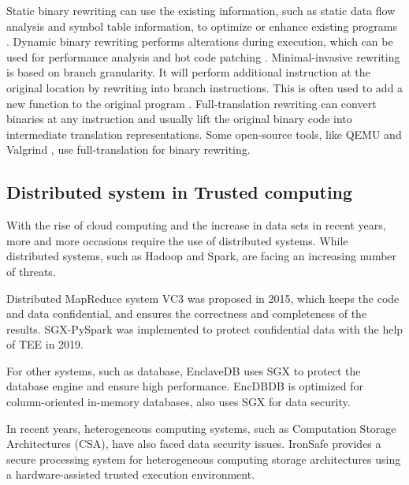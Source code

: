 Static binary rewriting can use the existing information, such as static data flow analysis and
symbol table information, to optimize or enhance existing programs \cite{10.1145/2629335, Schwarz2007PLTOAL}.
Dynamic binary rewriting performs alterations during execution, which can be used for
performance analysis \cite{Luk2005PinBC} and hot code patching \cite{Bruening2003AnIF}.
Minimal-invasive rewriting is based on branch granularity. It will perform additional instruction
at the original location by rewriting into branch instructions. This is often used to add a new
function to the original program \cite{Federico2017revngAU}.
Full-translation rewriting can convert binaries at any instruction and usually lift the original
binary code into intermediate translation representations. Some open-source tools,
like QEMU \cite{Bellard2005QEMUAF} and Valgrind \cite{Nethercote2007ValgrindAF},
use full-translation for binary rewriting.


\subsection{Distributed system in Trusted computing}
With the rise of cloud computing and the increase in data sets in recent years,
more and more occasions require the use of distributed systems.
While distributed systems, such as Hadoop and Spark, are facing an increasing number
of threats.

Distributed MapReduce system VC3 \cite{Schuster2015VC3TD} was proposed in 2015,
which keeps the code and data confidential, and ensures the correctness and completeness of
the results. SGX-PySpark \cite{Quoc2019SGXPySparkSD} was implemented to protect confidential data
with the help of TEE in 2019.

For other systems, such as database, EnclaveDB \cite{Priebe2018EnclaveDBAS} uses SGX to
protect the database engine and ensure high performance.
EncDBDB \cite{Fuhry2021EncDBDBSE} is optimized for column-oriented in-memory databases,
also uses SGX for data security.

In recent years, heterogeneous computing systems, such as Computation Storage Architectures (CSA),
have also faced data security issues.
IronSafe \cite{Unnibhavi2022SecureAP} provides a secure processing system for heterogeneous
computing storage architectures using a hardware-assisted trusted execution environment.